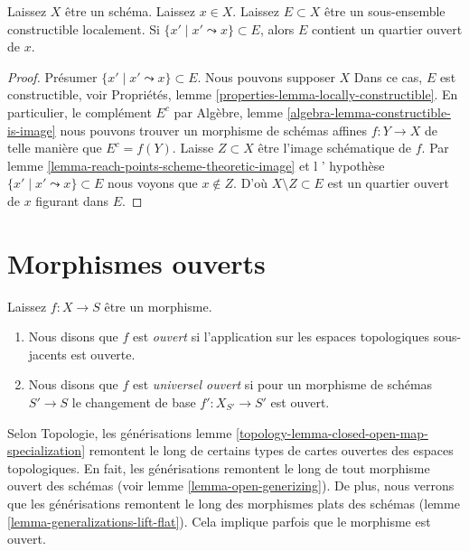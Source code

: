 \begin{lemma}

\label{lemma-constructible-containing-open}
Laissez $X$ être un schéma. Laissez $x \in X$. Laissez $E \subset X$ être un sous-ensemble constructible localement. Si $\{x' \mid x' \leadsto x\} \subset E$, alors $E$ contient un quartier ouvert de $x$.
\end{lemma}

\begin{proof}

Présumer $\{x' \mid x' \leadsto x\} \subset E$. Nous pouvons supposer $X$ Dans ce cas, $E$ est constructible, voir Propriétés, lemme \ref{properties-lemma-locally-constructible}. En particulier, le complément $E^c$ par Algèbre, lemme \ref{algebra-lemma-constructible-is-image}
nous pouvons trouver un morphisme de schémas affines $f : Y \to X$ de telle manière que
$E^c = f(Y)$. Laisse $Z \subset X$ être l'image schématique de $f$. Par lemme \ref{lemma-reach-points-scheme-theoretic-image}
et l ' hypothèse $\{x' \mid x' \leadsto x\} \subset E$
nous voyons que $x \not \in Z$. D'où $X \setminus Z \subset E$ est un quartier ouvert de $x$ figurant dans $E$.

\end{proof}




\section{Morphismes ouverts}
\label{section-open}

\begin{definition}

\label{definition-open}
Laissez $f : X \to S$ être un morphisme.
\begin{enumerate}
\item Nous disons que $f$ est {\it ouvert} si l'application sur les espaces topologiques sous-jacents est ouverte.
\item Nous disons que $f$ est {\it universel ouvert} si pour un morphisme de schémas $S' \to S$ le changement de base $f' : X_{S'} \to S'$ est ouvert.
\end{enumerate}

\end{definition}

\noindent
Selon Topologie, les générisations lemme \ref{topology-lemma-closed-open-map-specialization} remontent le long de certains types de cartes ouvertes des espaces topologiques. En fait, les générisations remontent le long de tout morphisme ouvert des schémas (voir lemme \ref{lemma-open-generizing}). De plus, nous verrons que les générisations remontent le long des morphismes plats des schémas (lemme \ref{lemma-generalizations-lift-flat}). Cela implique parfois que le morphisme est ouvert.

